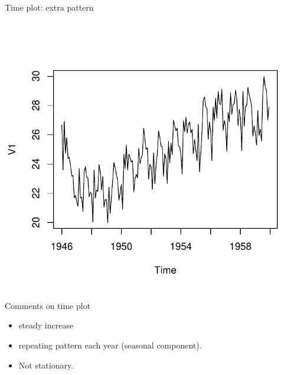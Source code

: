 \begin{frame}[fragile]{Time plot: extra pattern}
  
\begin{knitrout}
\color{fgcolor}\begin{kframe}
\begin{alltt}
\end{alltt}
\end{kframe}
\includegraphics[width=\maxwidth]{figure/akjsalkasl-1} 

\end{knitrout}
  
\end{frame}

\begin{frame}[fragile]{Comments on time plot}
  
  \begin{itemize}
\item steady increase
\item repeating pattern each year (seasonal component).
\item Not stationary.
  \end{itemize}
  
\end{frame}

